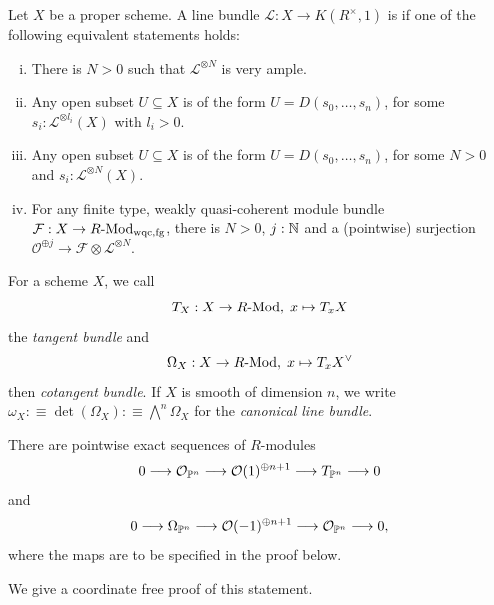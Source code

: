 \begin{definition}
  Let $X$ be a proper scheme.
  A line bundle $\mathcal L : X\to K(R^\times,1)$ is 
  if one of the following equivalent statements holds:
  \begin{enumerate}[(i)]
  \item There is $N>0$ such that $\mathcal L^{\otimes N}$ is very ample.
  \item Any open subset $U\subseteq X$ is of the form $U=D(s_0,\dots,s_n)$,
    for some $s_i:\mathcal L^{\otimes l_i}(X)$ with $l_i>0$.
  \item Any open subset $U\subseteq X$ is of the form $U=D(s_0,\dots,s_n)$,
    for some $N>0$ and $s_i:\mathcal L^{\otimes N}(X)$.
  \item For any finite type, weakly quasi-coherent module bundle $\mathcal F:X\to R\text{-}\mathrm{Mod}_{\mathrm{wqc,fg}}$,
    there is $N>0$, $j:\mathbb{N}$ and a (pointwise) surjection
    $\mathcal O^{\oplus j}\to \mathcal F\otimes \mathcal L^{\otimes N}$.
  \end{enumerate}
\end{definition}

\begin{definition}
  For a scheme $X$, we call
  \[
    T_X : X \to R\text{-}\mathrm{Mod},\; x \mapsto T_xX
  \]
  the \emph{tangent bundle} and
  \[
    \Omega_X : X \to R\text{-}\mathrm{Mod},\; x \mapsto T_xX^\vee
  \]
  then \emph{cotangent bundle}.
  If $X$ is smooth of dimension $n$, we write $\omega_X :\equiv \det(\Omega_X) :\equiv \bigwedge^n\Omega_X$ for the  \emph{canonical line bundle}.
\end{definition}

\begin{lemma}
  There are pointwise exact sequences of $R$-modules
  \[
    0 \longrightarrow
    \mathcal O_{\mathbb{P}^n} \longrightarrow
    \mathcal O(1)^{\oplus n+1} \longrightarrow
    T_{\mathbb{P}^n} \longrightarrow
    0
  \]
  and
  \[
    0 \longrightarrow
    \Omega_{\mathbb{P}^n} \longrightarrow
    \mathcal O(-1)^{\oplus n+1} \longrightarrow
    \mathcal O_{\mathbb{P}^n} \longrightarrow
    0,
  \]
  where the maps are to be specified in the proof below.
\end{lemma}

  We give a coordinate free proof of this statement.

